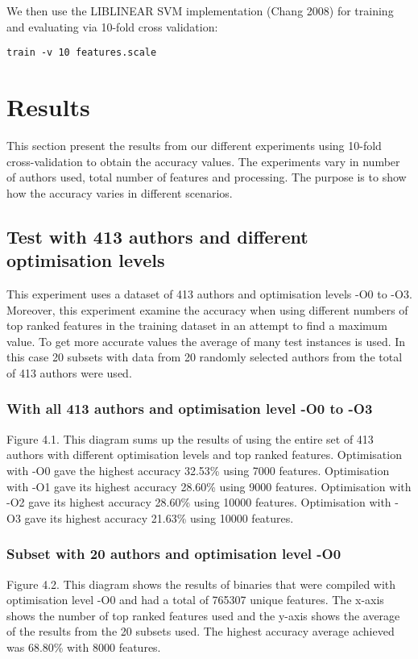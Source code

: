 \documentclass[a4paper,11pt]{kth-mag}
\begin{document}
We then use the LIBLINEAR SVM implementation (Chang 2008) for training and
evaluating via 10-fold cross validation:
\begin{lstlisting}
train -v 10 features.scale
\end{lstlisting}


\chapter{Results}
This section present the results from our different experiments using 10-fold
cross-validation to obtain the accuracy values. The experiments vary in number
of authors used, total number of features and processing. The purpose is to
show how the accuracy varies in different scenarios.  

\section{Test with 413 authors and different optimisation levels}
This experiment uses a dataset of 413 authors and optimisation levels -O0 to
-O3. Moreover, this experiment examine the accuracy when using different
numbers of top ranked features in the training dataset in an attempt to find a
maximum value. To get more accurate values the average of many test instances
is used. In this case 20 subsets with data from 20 randomly selected authors
from the total of 413 authors were used.

\subsection{With all 413 authors and optimisation level -O0 to -O3}
Figure 4.1. This diagram sums up the results of using the entire set of 413
authors with different optimisation levels and top ranked features.
Optimisation with -O0 gave the highest accuracy 32.53\% using 7000 features.
Optimisation with -O1 gave its highest accuracy 28.60\% using 9000 features.
Optimisation with -O2 gave its highest accuracy 28.60\% using 10000 features.
Optimisation with -O3 gave its highest accuracy 21.63\% using 10000 features. 


\subsection{Subset with 20 authors and optimisation level -O0}
Figure 4.2. This diagram shows the results of binaries that were compiled with
optimisation level -O0 and had a total of 765307 unique features. The x-axis
shows the number of top ranked features used  and the y-axis shows the average
of the results from the 20 subsets used. The highest accuracy average achieved
was 68.80\% with 8000 features. 
\end{document}
